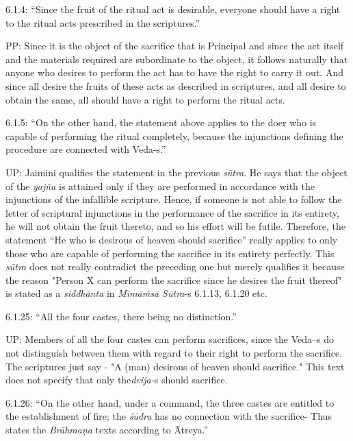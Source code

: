 6.1.4: “Since the fruit of the ritual act is desirable, everyone should have a right to the ritual acts prescribed in the scriptures.”

PP: Since it is the object of the sacrifice that is Principal and since the act itself and the materials required are subordinate to the object, it follows naturally that anyone who desires to perform the act has to have the right to carry it out. And since all desire the fruits of these acts as described in scriptures, and all desire to obtain the same, all should have a right to perform the ritual acts.

6.1.5: “On the other hand, the statement above applies to the doer who is capable of performing the ritual completely, because the injunctions defining the procedure are connected with Veda-s.”

UP: Jaimini qualifies the statement in the previous \textit{sūtra}. He says that the object of the \textit{yajña} is attained only if they are performed in accordance with the injunctions of the infallible scripture. Hence, if someone is not able to follow the letter of scriptural injunctions in the performance of the sacrifice in its entirety, he will not obtain the fruit thereto, and so his effort will be futile. Therefore, the statement “He who is desirous of heaven should sacrifice” really applies to only those who are capable of performing the sacrifice in its entirety perfectly. This \textit{sūtra} does not really contradict the preceding one but merely qualifies it because the reason "Person X can perform the sacrifice since he desires the fruit thereof" is stated as a \textit{siddhānta} in \textit{Mīmāṁsā Sūtra}-s 6.1.13, 6.1.20 etc.

6.1.25: “All the four castes, there being no distinction.”

UP: Members of all the four castes can perform sacrifices, since the Veda--s do not distinguish between them with regard to their right to perform the sacrifice. The scriptures just say - "A (man) desirous of heaven should sacrifice." This text does not specify that only the\break \textit{dvija-}s should sacrifice.

6.1.26: “On the other hand, under a command, the three castes are entitled to the establishment of fire; the \textit{śūdra} has no connection with the sacrifice- Thus states the \textit{Brāhmaṇa} texts according to Ātreya.”

